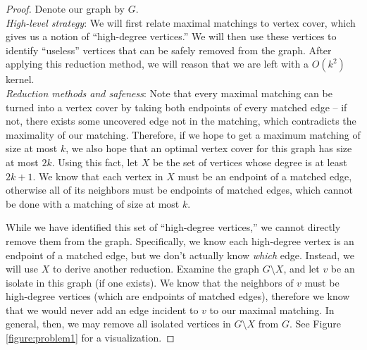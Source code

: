 \documentclass{article}
\begin{document}
\begin{proof} Denote our graph by $G$. \\

\noindent \emph{High-level strategy}: We will first relate maximal matchings to vertex cover, which gives us a notion of ``high-degree vertices.'' We will then use these vertices to identify ``useless'' vertices that can be safely removed from the graph. After applying this reduction method, we will reason that we are left with a $O(k^2)$ kernel.\\

\noindent \emph{Reduction methods and safeness}: Note that every maximal matching can be turned into a vertex cover by taking both endpoints of every matched edge -- if not, there exists some uncovered edge not in the matching, which contradicts the maximality of our matching. Therefore, if we hope to get a maximum matching of size at most $k$, we also hope that an optimal vertex cover for this graph has size at most $2k$. Using this fact, let $X$ be the set of vertices whose degree is at least $2k+1$. We know that each vertex in $X$ must be an endpoint of a matched edge, otherwise all of its neighbors must be endpoints of matched edges, which cannot be done with a matching of size at most $k$.

While we have identified this set of ``high-degree vertices,'' we cannot directly remove them from the graph. Specifically, we know each high-degree vertex is an endpoint of a matched edge, but we don't actually know \emph{which} edge. Instead, we will use $X$ to derive another reduction. Examine the graph $G \setminus X$, and let $v$ be an isolate in this graph (if one exists). We know that the neighbors of $v$ must be high-degree vertices (which are endpoints of matched edges), therefore we know that we would never add an edge incident to $v$ to our maximal matching. In general, then, we may remove all isolated vertices in $G \setminus X$ from $G$. See Figure \ref{figure:problem1} for a visualization.


\end{proof}
\end{document}
